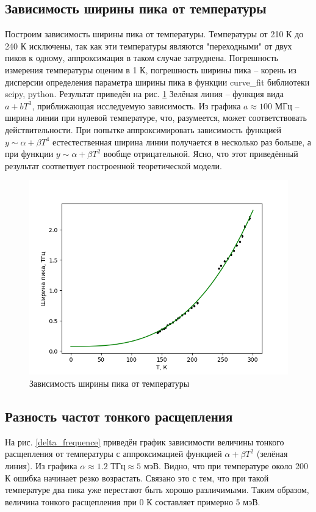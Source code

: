 \subsection{Зависимость ширины пика от температуры}
Построим зависимость ширины пика от температуры. Температуры от 210 К до 240 К 
исключены, так как эти температуры являются "переходными" от двух пиков к одному,
аппроксимация в таком случае затруднена. Погрешность измерения температуры оценим в
1 К, погрешность ширины пика -- корень из дисперсии определения параметра ширины пика 
в функции curve\_fit библиотеки scipy, python. Результат приведён на рис. \ref{peak_width}
Зелёная линия -- функция вида $a + bT^3$, приближающая исследуемую зависимость. 
Из графика $a \approx 100 \text{ МГц}$ -- ширина линии при нулевой температуре, что, разумеется,
может соответствовать действительности. При попытке аппроксимировать зависимость
функцией $y \sim \alpha + \beta T^4$ естестественная ширина линии получается в несколько
раз больше, а при функции $y \sim \alpha + \beta T^2$ вообще отрицательной. 
Ясно, что этот приведённый результат соответвует построенной теоретической модели. 

\begin{figure}[!h]
    \begin{center}
        \includegraphics[width=0.9 \linewidth]{peak_width.png}
        \caption{Зависимость ширины пика от температуры}
        \label{peak_width}
    \end{center}
\end{figure}


\subsection{Разность частот тонкого расщепления}
На рис. \ref{delta_frequence} приведён график зависимости величины тонкого
расщепления от температуры с аппроксимацией функцией $\alpha + \beta T^2$ (зелёная
линия). Из графика $\alpha \approx 1.2 \text{ ТГц} \approx 5 \text{ мэВ}$. Видно, что 
при температуре около 200 К ошибка начинает резко возрастать. Связано это с тем, что 
при такой температуре два пика уже перестают быть хорошо различимыми. Таким образом, 
величина тонкого расщепления при 0 К составляет примерно 5 мэВ.


